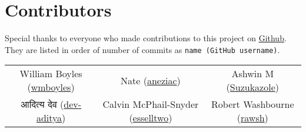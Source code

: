 \section{Contributors}
Special thanks to everyone who made contributions to this project on \href{https://github.com/wmboyles/Math-Summaries}{Github}.
They are listed in order of number of commits as \texttt{name (GitHub username)}.

\begin{center}
    \begin{tabular}{ c c c }
    	William Boyles (\href{https://github.com/wmboyles}{wmboyles}) & Nate (\href{https://github.com/aneziac}{aneziac}) & Ashwin M  (\href{https://github.com/Suzukazole}{Suzukazole}) \\
		आदित्य देव (\href{https://github.com/dev-aditya}{dev-aditya}) & Calvin McPhail-Snyder (\href{https://github.com/esselltwo}{esselltwo}) & Robert Washbourne (\href{https://github.com/rawsh}{rawsh}) \\
	\end{tabular}
\end{center}
